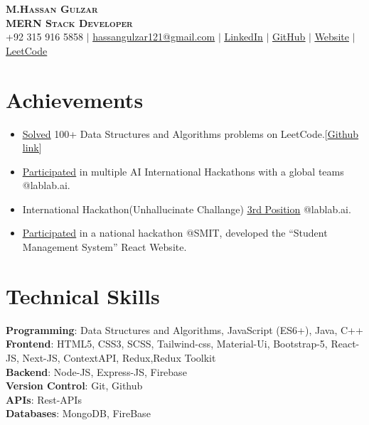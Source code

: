 \documentclass[letterpaper,11pt]{article}
\newcommand{\resumeItem}[1]{
  \item\small{
    {#1 \vspace{-2pt}}
  }
}
\newcommand{\resumeItemListStart}{\begin{itemize}}
\newcommand{\resumeItemListEnd}{\end{itemize}\vspace{-5pt}}
\begin{document}
\begin{center}
    \textbf{\Huge \scshape M.Hassan Gulzar} \\ \vspace{1pt}
    \textbf{\small \scshape MERN Stack Developer} \\ \vspace{5pt}
  \small +92 315 916 5858 $|$
  \href{mailto:hassangulzar121@gmail.com}{hassangulzar121@gmail.com}  $|$
  \href{https://www.linkedin.com/in/hassan-gulzar-256292267/}{\underline{LinkedIn}} $|$
  \href{https://github.com/hassangulzar1}{\underline{GitHub}} $|$
  \href{https://hassan-gulzar.vercel.app/}{\underline{Website}} $|$
  \href{https://leetcode.com/M_HassanGulzar/}{\underline{LeetCode}}
\end{center}

\section{Achievements}
\resumeItemListStart
\resumeItem{{\href{https://leetcode.com/M_HassanGulzar/}{\underline{Solved}}} 100+ Data Structures and Algorithms problems on LeetCode.[{\href{https://github.com/Ahmadjajja/JAVA_DSA}{\underline{Github link}}}]}
\resumeItem{{\href{https://lablab.ai/u/@hassangulzar1926}{\underline{Participated}}} in multiple AI International Hackathons with a global teams @lablab.ai.}
\resumeItem{International Hackathon(Unhallucinate Challange) {\href{https://www.linkedin.com/posts/hassan-gulzar-256292267_hackathon-hackathonwinner-startup-activity-7176665274249560064-KLsP?utm_source=share&utm_medium=member_desktop}{\underline{3rd Position}}} @lablab.ai.}
\resumeItem{{\href{https://github.com/hassangulzar1/student-managment-system}{\underline{Participated}}} in a national hackathon @SMIT, developed the “Student Management System” React Website.}

\resumeItemListEnd

\section{Technical Skills}
\begin{itemize}[leftmargin=0.15in, label={}]
  \small{\item{
        \textbf{Programming}{: Data Structures and Algorithms, JavaScript (ES6+), Java, C++} \\
        \textbf{Frontend}{: HTML5, CSS3, SCSS, Tailwind-css, Material-Ui, Bootstrap-5, React-JS, Next-JS,   ContextAPI, Redux,Redux Toolkit} \\
        \textbf{Backend}{: Node-JS, Express-JS, Firebase} \\
        \textbf{Version Control}{: Git, Github} \\
        \textbf{APIs}{: Rest-APIs} \\
        \textbf{Databases}{: MongoDB, FireBase}\\
        }}
\end{itemize}
%
\end{document}
